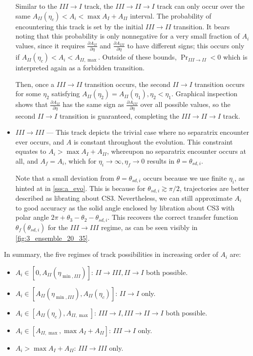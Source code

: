 \documentclass[
        fleqn,
        usenatbib,
    ]{mnras}
\newcommand*{\pd}[2]{\frac{\partial#1}{\partial#2}}
\newcommand*{\p}[1]{\left(#1\right)}
\newcommand*{\s}[1]{\left[#1\right]}
\begin{document}
\begin{itemize}
        Similar to the $III \to I$ track, the $III \to II \to I$ track can only
        occur over the same $A_{II}(\eta_c) < A_i < \max A_I + A_{II}$ interval.
        The probability of encountering this track is set by the initial $III
        \to II$ transition. It bears noting that this probability is only
        nonnegative for a very small fraction of $A_i$ values, since it requires
        $\pd{A_{II}}{\eta}$ and $\pd{A_{III}}{\eta}$ to have different signs;
        this occurs only if $A_{II}\p{\eta_c} < A_i < A_{II, \max}$. Outside of
        these bounds, $\Pr_{III \to II} < 0$ which is interpreted again as a
        forbidden transition.

        Then, once a $III \to II$ transition occurs, the second $II \to I$
        transition occurs for some $\eta_2$ satisfying $A_{II}(\eta_2) =
        A_{II}(\eta_1), \eta_2 < \eta_1$. Graphical inspection shows that
        $\pd{A_{II}}{\eta}$ has the same sign as $\pd{A_{III}}{\eta}$ over all
        possible values, so the second $II \to I$ transition is guaranteed,
        completing the $III \to II \to I$ track.

    \item $III \to III$ --- This track depicts the trivial case where no
        separatrix encounter ever occurs, and $A$ is constant throughout the
        evolution. This constraint equates to $A_i > \max A_I + A_{II}$,
        whereupon no separatrix encounter occurs at all, and $A_f = A_i$, which
        for $\eta_i \to \infty, \eta_f \to 0$ results in $\theta = \theta_{sd,
        i}$.

        Note that a small deviation from $\theta = \theta_{sd, i}$ occurs
        because we use finite $\eta_i$, as hinted at in \autoref{sss:a_evo}.
        This is because for $\theta_{sd, i} \gtrsim \pi/2$, trajectories are
        better described as librating about CS3. Nevertheless, we can still
        approximate $A_i$ to good accuracy as the solid angle enclosed by
        libration about CS3 with polar angle $2\pi + \theta_3 - \theta_2 -
        \theta_{sd, i}$. This recovers the correct transfer function
        $\theta_f\p{\theta_{sd, i}}$ for the $III \to III$ regime, as can be
        seen visibly in \autoref{fig:3_ensemble_20_35}.
\end{itemize}
In summary, the five regimes of track possibilities in increasing order of $A_i$
are:
\begin{itemize}
    \item $A_i \in \s{0, A_{II}\p{\eta_{\min, III}}}$: $II \to III, II \to I$
        both possible.

    \item $A_i \in \s{A_{II}\p{\eta_{\min, III}}, A_{II}(\eta_c)}$: $II \to I$
        only.

    \item $A_i \in \s{A_{II}(\eta_c), A_{II, \max}}$: $III \to I, III \to II \to
        I$ both possible.

    \item $A_i \in \s{A_{II, \max}, \max A_I + A_{II}}$: $III \to I$ only.

    \item $A_i > \max A_I + A_{II}$: $III \to III$ only.
\end{itemize}
\end{document}
